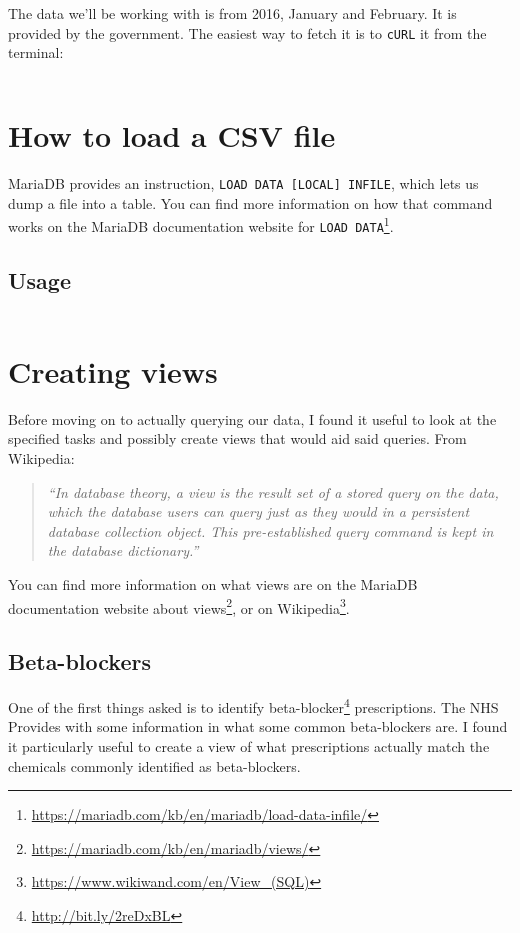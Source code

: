 \documentclass[english,a4paper,]{report}
\renewcommand{\href}[2]{#2\footnote{\url{#1}}}
\begin{document}
The data we'll be working with is from 2016, January and February. It is
provided by the government. The easiest way to fetch it is to
\texttt{cURL} it from the terminal:

\inputminted[lastline=114]{bash}{setup}

\section{How to load a CSV file}\label{how-to-load-a-csv-file}

MariaDB provides an instruction,
\texttt{LOAD\ DATA\ {[}LOCAL{]}\ INFILE}, which lets us dump a file into
a table. You can find more information on how that command works on the
MariaDB documentation website for
\href{https://mariadb.com/kb/en/mariadb/load-data-infile/}{\texttt{LOAD\ DATA}}.

\subsection{Usage}\label{usage}

\inputminted[firstline=55,lastline=97]{sql}{src/sql/00-setup.sql}

\section{Creating views}\label{creating-views}

Before moving on to actually querying our data, I found it useful to
look at the specified tasks and possibly create views that would aid
said queries. From Wikipedia:

\begin{quote}
\emph{``In database theory, a view is the result set of a stored query
on the data, which the database users can query just as they would in a
persistent database collection object. This pre-established query
command is kept in the database dictionary.''}
\end{quote}

You can find more information on what views are on the MariaDB
documentation website
\href{https://mariadb.com/kb/en/mariadb/views/}{about views}, or on
\href{https://www.wikiwand.com/en/View_(SQL)}{Wikipedia}.

\subsection{Beta-blockers}\label{beta-blockers}

One of the first things asked is to identify
\href{http://bit.ly/2reDxBL}{beta-blocker} prescriptions. The NHS
Provides with some information in what some common beta-blockers are. I
found it particularly useful to create a view of what prescriptions
actually match the chemicals commonly identified as beta-blockers.
\end{document}
